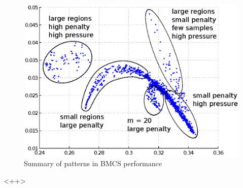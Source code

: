 \documentclass[10pt]{article}
\begin{document}
\begin{itemize}
\begin{figure}
  \begin{center}
    \includegraphics{bmcs_perf_summary.eps}
    \end{center}
    \caption{Summary of patterns in BMCS performance}
    \label{fig:bmcs_perf_summary}
    \end{figure}
\end{itemize}<++>
\end{document}

